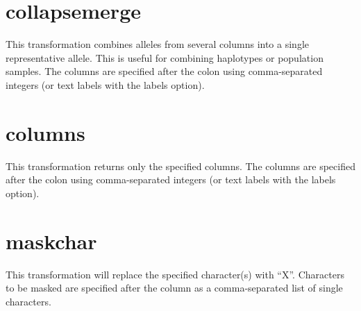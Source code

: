\documentclass[letterpaper,11pt,english]{sphinxmanual}
\begin{document}
\section{collapsemerge}
\label{\detokenize{mvf_filter_modules:collapsemerge}}
This transformation combines alleles from several columns
into a single representative allele. This is useful for
combining haplotypes or population samples. The columns
are specified after the colon using comma-separated integers
(or text labels with the \textendash{}labels option).

%
\begin{sphinxVerbatim}[commandchars=\\\{\}]
  
 
 
 
\end{sphinxVerbatim}


\section{columns}
\label{\detokenize{mvf_filter_modules:columns}}
This transformation returns only the specified columns.
The columns are specified after the colon using comma-separated integers
(or text labels with the \textendash{}labels option).

%
\begin{sphinxVerbatim}[commandchars=\\\{\}]
  
 
 
\end{sphinxVerbatim}


\section{maskchar}
\label{\detokenize{mvf_filter_modules:maskchar}}
This transformation will replace the specified character(s) with “X”.
Characters to be masked are specified after the column
as a comma-separated list of single characters.
\end{document}
